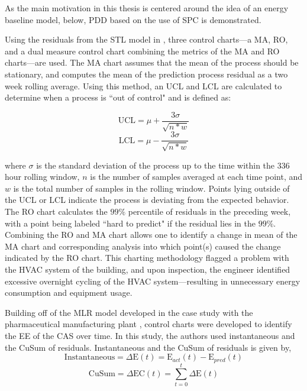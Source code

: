 As the main motivation in this thesis is centered around the idea of an energy baseline model, below, PDD based on the use of SPC is demonstrated.

Using the residuals from the STL model in \cite{tightening}, three control charts—a \ac{MA}, \ac{RO}, and a dual measure control chart combining the metrics of the MA and RO charts—are used. The MA chart assumes that the mean of the process should be stationary, and computes the mean of the prediction process residual as a two week rolling average. Using this method, an \ac{UCL} and \ac{LCL} are calculated to determine when a process is ``out of control" and is defined as:

\begin{equation}
    \text{UCL} = \mu + \frac{3\sigma}{\sqrt{n * w}}
\end{equation}
\begin{equation}
    \text{LCL} = \mu - \frac{3\sigma}{\sqrt{n * w}}
\end{equation}


where $\sigma$ is the standard deviation of the process up to the time within the $336$ hour rolling window, $n$ is the number of samples averaged at each time point, and $w$ is the total number of samples in the rolling window. Points lying outside of the UCL or LCL indicate the process is deviating from the expected behavior. The RO chart calculates the $99\%$ percentile of residuals in the preceding week, with a point being labeled ``hard to predict" if the residual lies in the $99\%$. Combining the RO and MA chart allows one to identify a change in mean of the MA chart and corresponding analysis into which point(s) caused the change indicated by the RO chart. This charting methodology flagged a problem with the HVAC system of the building, and upon inspection, the engineer identified excessive overnight cycling of the HVAC system—resulting in unnecessary energy consumption and equipment usage. 

Building off of the MLR model developed in the case study with the pharmaceutical manufacturing plant \cite{cas}, control charts were developed to identify the EE of the CAS over time. In this study, the authors used instantaneous and the \ac{CuSum} of residuals. Instantaneous and the CuSum of residuals is given by,
\begin{equation}
    \text{Instantaneous} = \Delta \text{E}(t) = \text{E}_{act}(t) - \text{E}_{pred}(t)
\end{equation}
\begin{equation}
    \text{CuSum} = \Delta \text{EC}(t) = \sum_{t=0}^t\Delta \text{E}(t)
\end{equation}

